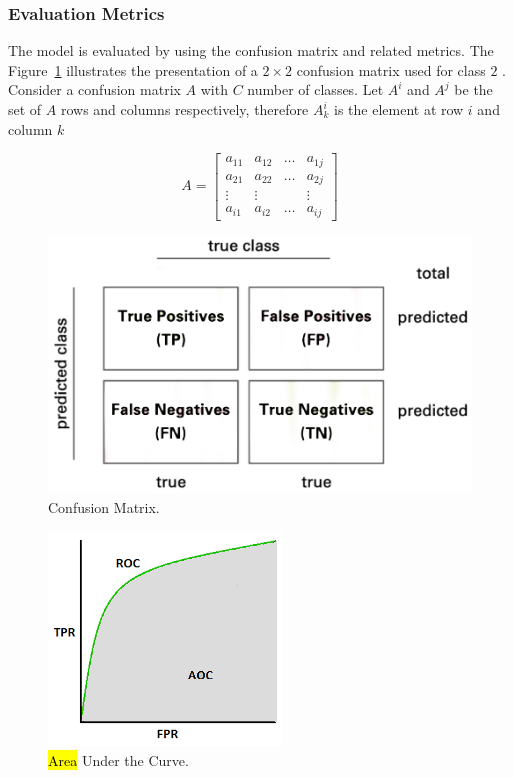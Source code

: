 \documentclass[sensors,article,accept,pdftex,moreauthors]{Definitions/mdpi}
\begin{document}
	\subsubsection{Evaluation Metrics}

	The model is evaluated by using the confusion matrix and related metrics. The Figure~\ref{fig:confusion-matrix} illustrates the presentation of a $2 \times 2$ confusion matrix used for class $2$ . Consider a confusion matrix $A$ with $C$ number of classes. Let $A^i$ and $A^j$ be the set of $A$ rows and columns respectively, therefore $A^i_k$ is the element at row $i$ and column $k$
	
	\[
	A = \begin{bmatrix}
		a_{11} & a_{12} & \dots & a_{1j} \\
		a_{21} & a_{22} & \dots & a_{2j} \\
		\vdots & \vdots	&  & \vdots\\
		a_{i1} & a_{i2} & \dots & a_{ij} 
	\end{bmatrix}
	\]

\vspace{-12pt}
		\begin{figure}[H]
\includegraphics[width=0.6\linewidth]{Definitions/Confusion-matrix}
\caption{Confusion Matrix.}\label{fig:confusion-matrix}
		\end{figure}\unskip
\begin{figure}[H]
\includegraphics[width=.5\linewidth]{Definitions/AUC}
\caption{\hl{Area} %
 Under the Curve.}\label{fig:AUC}
	\end{figure}
	
\end{document}
